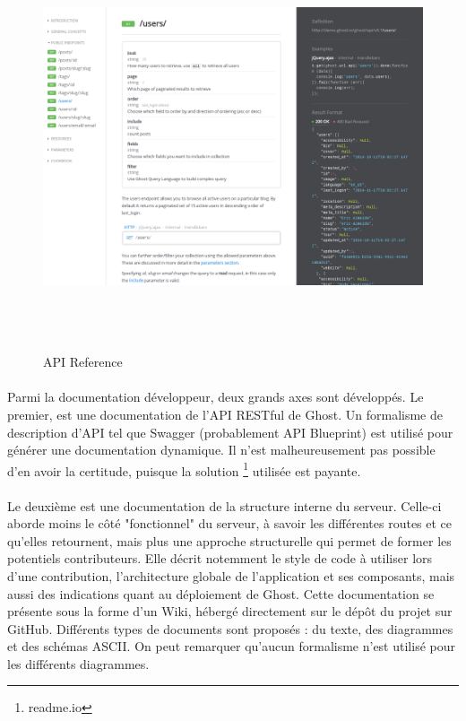         \newpage
        \begin{figure}[h]
            \centering
            \includegraphics[height=12cm]{./assets/ghost2.png}
            \caption{API Reference}
        \end{figure}
        \paragraph{}
            Parmi la documentation développeur, deux grands axes sont développés.
            Le premier, est une documentation de l'API RESTful de Ghost. Un formalisme de description
            d'API tel que Swagger (probablement API Blueprint) est utilisé pour générer une documentation
            dynamique. Il n'est malheureusement pas possible d'en avoir la certitude, puisque la solution
            \footnote{readme.io} utilisée est payante.



        \newpage
        \paragraph{}
            Le deuxième est une documentation de la structure interne du serveur. Celle-ci aborde moins
            le côté "fonctionnel" du serveur, à savoir les différentes routes et ce qu'elles retournent, mais
            plus une approche structurelle qui permet de former les potentiels contributeurs. Elle
            décrit notemment le style de code à utiliser lors d'une contribution, l'architecture globale
            de l'application et ses composants, mais aussi des indications quant au déploiement de Ghost.
            Cette documentation se présente sous la forme d'un Wiki, hébergé directement sur le
            dépôt du projet sur GitHub. Différents types de documents sont proposés : du texte, des
            diagrammes et des schémas ASCII. On peut remarquer qu'aucun formalisme n'est utilisé
            pour les différents diagrammes.

